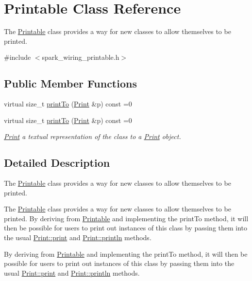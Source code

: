 \hypertarget{class_printable}{}\section{Printable Class Reference}
\label{class_printable}


The \hyperlink{class_printable}{Printable} class provides a way for new classes to allow themselves to be printed.  




{\ttfamily \#include $<$spark\+\_\+wiring\+\_\+printable.\+h$>$}

\subsection*{Public Member Functions}
\begin{DoxyCompactItemize}
\item 
virtual size\+\_\+t \hyperlink{class_printable_a2c5776bc55c0a3a5675bba9d4d8e3681}{print\+To} (\hyperlink{class_print}{Print} \&p) const =0
\item 
virtual size\+\_\+t \hyperlink{class_printable_a2c5776bc55c0a3a5675bba9d4d8e3681}{print\+To} (\hyperlink{class_print}{Print} \&p) const =0
\begin{DoxyCompactList}\small\item\em \hyperlink{class_print}{Print} a textual representation of the class to a \hyperlink{class_print}{Print} object. \end{DoxyCompactList}\end{DoxyCompactItemize}


\subsection{Detailed Description}
The \hyperlink{class_printable}{Printable} class provides a way for new classes to allow themselves to be printed. 

The \hyperlink{class_printable}{Printable} class provides a way for new classes to allow themselves to be printed. By deriving from \hyperlink{class_printable}{Printable} and implementing the print\+To method, it will then be possible for users to print out instances of this class by passing them into the usual \hyperlink{class_print_acfe80773011eb17dfb52c2fba517a093}{Print\+::print} and \hyperlink{class_print_ad337ce3f7977411b7d34d47a51e5737e}{Print\+::println} methods.

By deriving from \hyperlink{class_printable}{Printable} and implementing the print\+To method, it will then be possible for users to print out instances of this class by passing them into the usual \hyperlink{class_print_acfe80773011eb17dfb52c2fba517a093}{Print\+::print} and \hyperlink{class_print_ad337ce3f7977411b7d34d47a51e5737e}{Print\+::println} methods. 


